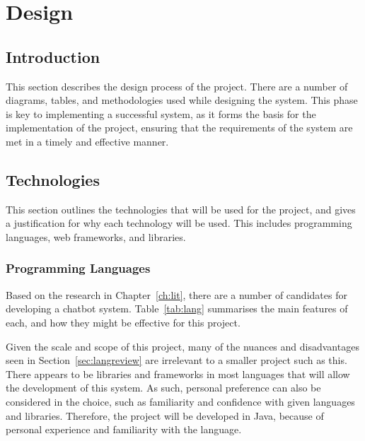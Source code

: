 \chapter{Design}
\label{ch:design}
\section{Introduction}
This section describes the design process of the project. There are a number of diagrams, tables, and methodologies used while designing the system. This phase is key to implementing a successful system, as it forms the basis for the implementation of the project, ensuring that the requirements of the system are met in a timely and effective manner.

\section{Technologies}
This section outlines the technologies that will be used for the project, and gives a justification for why each technology will be used. This includes programming languages, web frameworks, and libraries.

\subsection{Programming Languages}
\label{sec:lang}
Based on the research in Chapter~\ref{ch:lit}, there are a number of candidates for developing a chatbot system. Table~\ref{tab:lang} summarises the main features of each, and how they might be effective for this project.

Given the scale and scope of this project, many of the nuances and disadvantages seen in Section~\ref{sec:langreview} are irrelevant to a smaller project such as this. There appears to be libraries and frameworks in most languages that will allow the development of this system. As such, personal preference can also be considered in the choice, such as familiarity and confidence with given languages and libraries. Therefore, the project will be developed in Java, because of personal experience and familiarity with the language.

